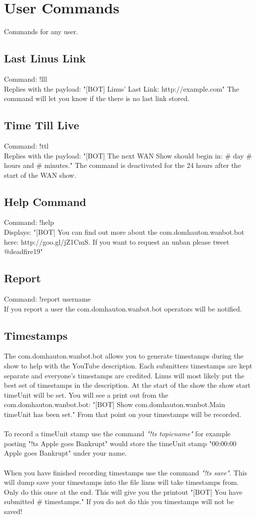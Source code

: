 \documentclass[10pt]{article}
\begin{document}
\section{User Commands}
Commands for any user.
\subsection{Last Linus Link}
Command: !lll\\
Replies with the payload: "[BOT] Linus' Last Link: http://example.com"
The command will let you know if the there is no last link stored.
\subsection{Time Till Live}
Command: !ttl\\
Replies with the payload: "[BOT] The next WAN Show should begin in: \# day \# hours and \# minutes."
The command is deactivated for the 24 hours after the start of the WAN show.
\subsection{Help Command}
Command: !help\\
Displays: "[BOT] You can find out more about the com.domhauton.wanbot.bot here: http://goo.gl/jZ1CmS. If you want to request an unban please tweet @deadfire19"
\subsection{Report}
Command: !report username\\
If you report a user the com.domhauton.wanbot.bot operators will be notified.
\subsection{Timestamps}
The com.domhauton.wanbot.bot allows you to generate timestamps during the show to help with the YouTube description. Each submitters timestamps are kept separate and everyone's timestamps are credited. Linus will most likely put the best set of timestamps in the description. At the start of the show the show start timeUnit will be set. You will see a print out from the com.domhauton.wanbot.bot: "[BOT] Show com.domhauton.wanbot.Main timeUnit has been set." From that point on your timestamps will be recorded.\\\\
 
To record a timeUnit stamp use the command \emph{"!ts topicname"} for example posting  "!ts Apple goes Bankrupt" would store the timeUnit stamp "00:00:00 Apple goes Bankrupt" under your name.
 \\\\
When you have finished recording timestamps use the command \emph{"!ts save"}. This will dump save your timestamps into the file linus will take timestamps from. Only do this once at the end. This will give you the printout "[BOT] You have submitted \# timestamps." If you do not do this you timestamps will not be saved!
\end{document}
